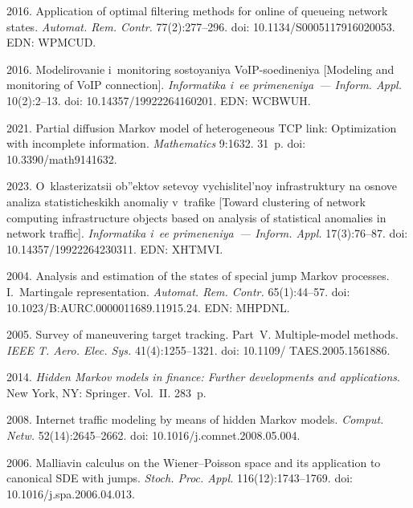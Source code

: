 \begin{multicols}{2}
{{\begin{thebibliography}{99}
 2016. 
Application of optimal filtering methods for online of queueing network states. 
\textit{Automat. Rem. Contr.} 77(2):277--296.
doi: 10.1134/S0005117916020053. EDN: WPMCUD.

 2016.
Mo\-de\-li\-ro\-va\-nie i~monitoring sostoyaniya VoIP-soedineniya [Modeling and 
monitoring of VoIP connection]. \textit{Informatika i~ee primeneniya~--- Inform. 
Appl.} 10(2):2--13. 
doi: 10.14357/19922264160201. EDN: WCBWUH.



 2021.
Partial diffusion Markov model of heterogeneous TCP link: Optimization with 
incomplete information. 
\textit{Mathematics} 9:1632. 31~p. doi: 10.3390/math9141632.

 2023.
O~klasterizatsii ob''ektov setevoy vychislitel'noy inf\-ra\-struk\-tu\-ry na osnove 
analiza statisticheskikh anomaliy v~trafike 
[Toward clustering of network computing infrastructure objects based on analysis 
of statistical anomalies in network traffic]. 
\textit{Informatika i~ee primeneniya~--- Inform. Appl.} 17(3):76--87. 
doi: 10.14357/19922264230311. EDN: XHTMVI.

 2004.
Analysis and estimation of the states of special jump Markov processes. 
I.~Martingale representation.
\textit{Automat. Rem. Contr.} 65(1):44--57.  
doi: 10.1023/B:AURC.0000011689.11915.24. EDN: MHPDNL.


 2005. 
Survey of maneuvering target tracking. Part~V. Multiple-model methods. 
\textit{IEEE T. Aero. Elec. Sys.} 41(4):1255--1321.
doi: 10.1109/ TAES.2005.1561886.

 2014. 
\textit{Hidden Markov models in finance: Further developments and applications}. 
New York, NY: Springer. Vol.~II. 283~p.

 2008.
Internet traffic modeling by means of hidden Markov models. 
\textit{Comput. Netw.} 52(14):2645--2662.
doi: 10.1016/j.\linebreak comnet.2008.05.004.

 2006. 
Malliavin calculus on the Wiener--Poisson space and its application to canonical 
SDE with jumps. 
\textit{Stoch. Proc. Appl.} 116(12):1743--1769.
doi: 10.1016/j.spa.2006.04.013.

\end{thebibliography}

 }
 }

\end{multicols}

